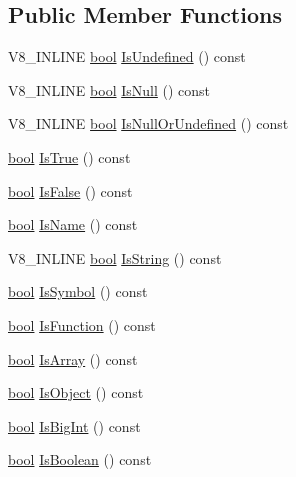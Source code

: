 \subsection*{Public Member Functions}
\begin{DoxyCompactItemize}
\item 
V8\+\_\+\+I\+N\+L\+I\+NE \mbox{\hyperlink{classbool}{bool}} \mbox{\hyperlink{classv8_1_1Value_ad3a7686feef02fbe0317570b9640b078}{Is\+Undefined}} () const
\item 
V8\+\_\+\+I\+N\+L\+I\+NE \mbox{\hyperlink{classbool}{bool}} \mbox{\hyperlink{classv8_1_1Value_a7710cf2aca870e961f1df65ef6057eb4}{Is\+Null}} () const
\item 
V8\+\_\+\+I\+N\+L\+I\+NE \mbox{\hyperlink{classbool}{bool}} \mbox{\hyperlink{classv8_1_1Value_a47bb1e442bf9741e9e29468659e8cdba}{Is\+Null\+Or\+Undefined}} () const
\item 
\mbox{\hyperlink{classbool}{bool}} \mbox{\hyperlink{classv8_1_1Value_a48c300598bad0155eb59965c9e6b86b6}{Is\+True}} () const
\item 
\mbox{\hyperlink{classbool}{bool}} \mbox{\hyperlink{classv8_1_1Value_a84b6682c5582e0ae14d85bd9b6f25522}{Is\+False}} () const
\item 
\mbox{\hyperlink{classbool}{bool}} \mbox{\hyperlink{classv8_1_1Value_a1ae3d5f5823705d2b6c26378201b772b}{Is\+Name}} () const
\item 
V8\+\_\+\+I\+N\+L\+I\+NE \mbox{\hyperlink{classbool}{bool}} \mbox{\hyperlink{classv8_1_1Value_a6c7582919eec6f30e865b3300eff9a8e}{Is\+String}} () const
\item 
\mbox{\hyperlink{classbool}{bool}} \mbox{\hyperlink{classv8_1_1Value_a0fee90dc2589b156d277a74b0b225a71}{Is\+Symbol}} () const
\item 
\mbox{\hyperlink{classbool}{bool}} \mbox{\hyperlink{classv8_1_1Value_ac7a649d482c41cfc6281a4215a091a6d}{Is\+Function}} () const
\item 
\mbox{\hyperlink{classbool}{bool}} \mbox{\hyperlink{classv8_1_1Value_a4908fac2c2888ade5d05a8dd312e1fd7}{Is\+Array}} () const
\item 
\mbox{\hyperlink{classbool}{bool}} \mbox{\hyperlink{classv8_1_1Value_a72a01e06e897a8fedbb430cdd7fc3ffe}{Is\+Object}} () const
\item 
\mbox{\hyperlink{classbool}{bool}} \mbox{\hyperlink{classv8_1_1Value_a19fe27cd498d16f014b6f40038ff96ef}{Is\+Big\+Int}} () const
\item 
\mbox{\hyperlink{classbool}{bool}} \mbox{\hyperlink{classv8_1_1Value_a7ab7130b87a1fbcced76268353fae00b}{Is\+Boolean}} () const

\end{DoxyCompactItemize}
